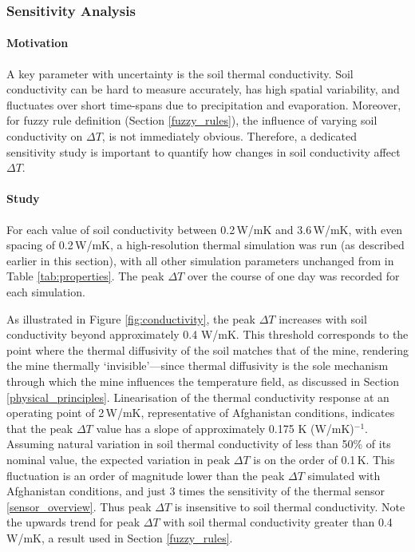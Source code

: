     \subsubsection{Sensitivity Analysis} \label{sec:cv_sensitivity}
    
        \paragraph{Motivation}
            
            \noindent A key parameter with uncertainty is the soil thermal conductivity. Soil conductivity can be hard to measure accurately, has high spatial variability, and fluctuates over short time-spans due to precipitation and evaporation. Moreover, for fuzzy rule definition (Section \ref{fuzzy_rules}), the influence of varying soil conductivity on \(\Delta T\), is not immediately obvious. Therefore, a dedicated sensitivity study is important to quantify how changes in soil conductivity affect \(\Delta T\).
        
        \paragraph{Study}
        
            \noindent For each value of soil conductivity between 0.2\,W/mK and 3.6\,W/mK, with even spacing of 0.2\,W/mK, a high-resolution thermal simulation was run (as described earlier in this section), with all other simulation parameters unchanged from in Table \ref{tab:properties}. The peak \(\Delta T\) over the course of one day was recorded for each simulation.
            
            As illustrated in Figure \ref{fig:conductivity}, the peak \(\Delta T\) increases with soil conductivity beyond approximately 0.4 W/mK. This threshold corresponds to the point where the thermal diffusivity of the soil matches that of the mine, rendering the mine thermally ‘invisible’—since thermal diffusivity is the sole mechanism through which the mine influences the temperature field, as discussed in Section \ref{physical_principles}. Linearisation of the thermal conductivity response at an operating point of 2\,W/mK, representative of Afghanistan conditions, indicates that the peak \(\Delta T\) value has a slope of approximately 0.175 K (W/mK)$^{-1}$. Assuming natural variation in soil thermal conductivity of less than 50\% of its nominal value, the expected variation in peak \(\Delta T\) is on the order of 0.1\,K. This fluctuation is an order of magnitude lower than the peak \(\Delta T\) simulated with Afghanistan conditions, and just 3 times the sensitivity of the thermal sensor \ref{sensor_overview}. Thus peak \(\Delta T\) is insensitive to soil thermal conductivity. Note the upwards trend for peak \(\Delta T\) with soil thermal conductivity greater than 0.4 W/mK, a result used in Section \ref{fuzzy_rules}.


